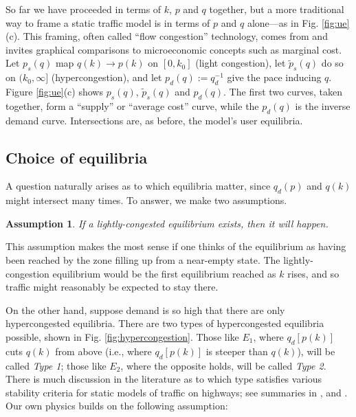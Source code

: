 \documentclass[preprint,authoryear]{elsarticle}
\newtheorem{assumption}{Assumption}
\begin{document}
So far we have proceeded in terms of $k$, $p$ and $q$ together, but a more traditional way to frame a static traffic model is in terms of $p$ and $q$ alone---as in Fig. \ref{fig:ue}(c). This framing, often called ``flow congestion'' technology, comes from \citet{Walters1961} and invites graphical comparisons to microeconomic concepts such as marginal cost. Let $p_s(q)$ map $q(k)\rightarrow p(k)$ on $[0,k_0]$ (light congestion), let $\tilde{p}_s(q)$ do so on $(k_0,\infty]$ (hypercongestion), and let $p_d(q):=q_d^{-1}$ give the pace inducing $q$. Figure \ref{fig:ue}(c) shows $p_s(q)$, $\tilde{p}_s(q)$ and $p_d(q)$. The first two curves, taken together, form a ``supply'' or ``average cost'' curve, while the $p_d(q)$ is the inverse demand curve. Intersections are, as before, the model's user equilibria. 

\subsection{Choice of equilibria}
\label{ssec:choice_of_equilibria}

A question naturally arises as to which equilibria matter, since $q_d(p)$ and $q(k)$ might intersect many times. To answer, we make two assumptions.
\begin{assumption}\label{ass:light-congestion}
If a lightly-congested equilibrium exists, then it will happen.
\end{assumption}
This assumption makes the most sense if one thinks of the equilibrium as having been reached by the zone filling up from a near-empty state. The lightly-congestion equilibrium would be the first equilibrium reached as $k$ rises, and so traffic might reasonably be expected to stay there.

On the other hand, suppose demand is so high that there are only hypercongested equilibria. There are two types of hypercongested equilibria possible, shown in Fig. \ref{fig:hypercongestion}. Those like $E_1$, where $q_d[p(k)]$ cuts $q(k)$ from above (i.e., where $q_d[p(k)]$ is steeper than $q(k)$), will be called \emph{Type 1}; those like $E_2$, where the opposite holds, will be called \emph{Type 2}. There is much discussion in the literature as to which type satisfies various stability criteria for static models of traffic on highways; see summaries in \citet{Verhoef1999}, \citet{Verhoef2005} and \citet{SmallChu2003}. Our own physics builds on the following assumption:
\end{document}
